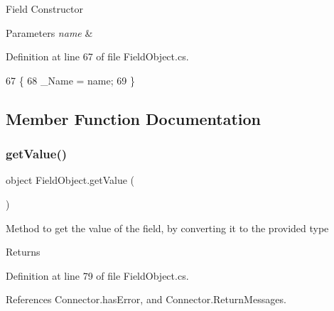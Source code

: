 Field Constructor 


\begin{DoxyParams}{Parameters}
{\em name} & \\
\hline
\end{DoxyParams}


Definition at line 67 of file Field\+Object.\+cs.


\begin{DoxyCode}
67                                     \{
68         \_Name = name;
69     \}
\end{DoxyCode}


\subsection{Member Function Documentation}
\mbox{\label{class_field_object_a8d962cda039f78f485232bd2764176c4}} 
\subsubsection{\texorpdfstring{get\+Value()}{getValue()}}
{\footnotesize\ttfamily object Field\+Object.\+get\+Value (\begin{DoxyParamCaption}{ }\end{DoxyParamCaption})}



Method to get the value of the field, by converting it to the provided type 

\begin{DoxyReturn}{Returns}

\end{DoxyReturn}


Definition at line 79 of file Field\+Object.\+cs.



References Connector.\+has\+Error, and Connector.\+Return\+Messages.


